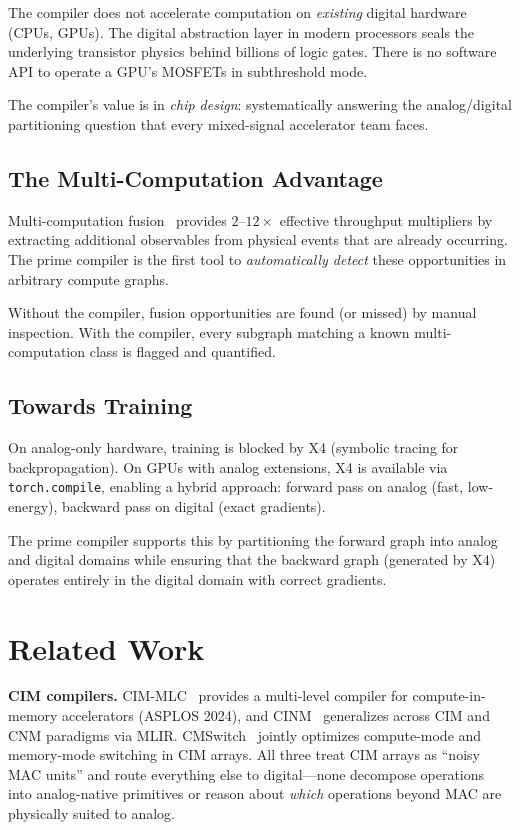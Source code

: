 \documentclass[11pt]{article}
\begin{document}
The compiler does not accelerate computation on \textit{existing} digital hardware (CPUs, GPUs). The digital abstraction layer in modern processors seals the underlying transistor physics behind billions of logic gates. There is no software API to operate a GPU's MOSFETs in subthreshold mode.

The compiler's value is in \textit{chip design}: systematically answering the analog/digital partitioning question that every mixed-signal accelerator team faces.

\subsection{The Multi-Computation Advantage}

Multi-computation fusion~\cite{bieg2026} provides $2$--$12\times$ effective throughput multipliers by extracting additional observables from physical events that are already occurring. The prime compiler is the first tool to \textit{automatically detect} these opportunities in arbitrary compute graphs.

Without the compiler, fusion opportunities are found (or missed) by manual inspection. With the compiler, every subgraph matching a known multi-computation class is flagged and quantified.

\subsection{Towards Training}

On analog-only hardware, training is blocked by X4 (symbolic tracing for backpropagation). On GPUs with analog extensions, X4 is available via \texttt{torch.compile}, enabling a hybrid approach: forward pass on analog (fast, low-energy), backward pass on digital (exact gradients).

The prime compiler supports this by partitioning the forward graph into analog and digital domains while ensuring that the backward graph (generated by X4) operates entirely in the digital domain with correct gradients.

\section{Related Work}
\label{sec:related}

\textbf{CIM compilers.} CIM-MLC~\cite{cimmlc2024} provides a multi-level compiler for compute-in-memory accelerators (ASPLOS 2024), and CINM~\cite{cinm2024} generalizes across CIM and CNM paradigms via MLIR. CMSwitch~\cite{cmswitch2025} jointly optimizes compute-mode and memory-mode switching in CIM arrays. All three treat CIM arrays as ``noisy MAC units'' and route everything else to digital---none decompose operations into analog-native primitives or reason about \textit{which} operations beyond MAC are physically suited to analog.
\end{document}
